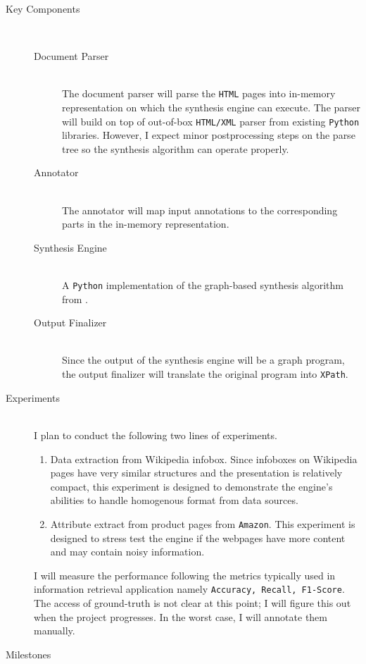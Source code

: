 \documentclass[12pt,a4paper]{article}
\begin{document}
\begin{description}
    \item[Key Components]\text{}\\
    \begin{description}
        \item[Document Parser]\text{}\\
        The document parser will parse the \texttt{HTML} pages into in-memory representation on which the synthesis engine can execute. The parser will build on top of out-of-box \texttt{HTML/XML} parser from existing \texttt{Python} libraries. However, I expect minor postprocessing steps on the parse tree so the synthesis algorithm can operate properly.
        \item[Annotator]\text{}\\
        The annotator will map input annotations to the corresponding parts in the in-memory representation.
        \item[Synthesis Engine]\text{}\\
        A \texttt{Python} implementation of the graph-based synthesis algorithm from \cite{Anton2005XPathWrapperIB}.
        \item[Output Finalizer]\text{}\\
        Since the output of the synthesis engine will be a graph program, the output finalizer will translate the original program into \texttt{XPath}.  
    \end{description}
    \item[Experiments]\text{}\\
    I plan to conduct the following two lines of experiments.
    \begin{enumerate}[label=(\alph*)]
        \item Data extraction from Wikipedia infobox. Since infoboxes on Wikipedia pages have very similar structures and the presentation is relatively compact, this experiment is designed to demonstrate the engine's abilities to handle homogenous format from data sources. 
        \item Attribute extract from product pages from \texttt{Amazon}. This experiment is designed to stress test the engine if the webpages have more content and may contain noisy information.
    \end{enumerate}
I will measure the performance following the metrics typically used in information retrieval application namely \texttt{Accuracy, Recall, F1-Score}. The access of ground-truth is not clear at this point; I will figure this out when the project progresses. In the worst case, I will annotate them manually.
    \item[Milestones]\text{}\\
    \begin{description}
        

\end{description}
\end{description}
\end{document}
